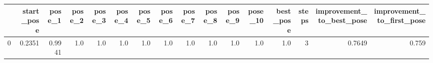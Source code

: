 \begin{tabular}{lrrrrrrrrrrrrrrr}
\toprule
{} &  start\_pose &  pose\_1 &  pose\_2 &  pose\_3 &  pose\_4 &  pose\_5 &  pose\_6 &  pose\_7 &  pose\_8 &  pose\_9 &  pose\_10 &  best\_pose &  steps &  improvement\_to\_best\_pose &  improvement\_to\_first\_pose \\
\midrule
0 &      0.2351 &  0.9941 &     1.0 &     1.0 &     1.0 &     1.0 &     1.0 &     1.0 &     1.0 &     1.0 &      1.0 &        1.0 &      3 &                    0.7649 &                      0.759 \\
\bottomrule
\end{tabular}
